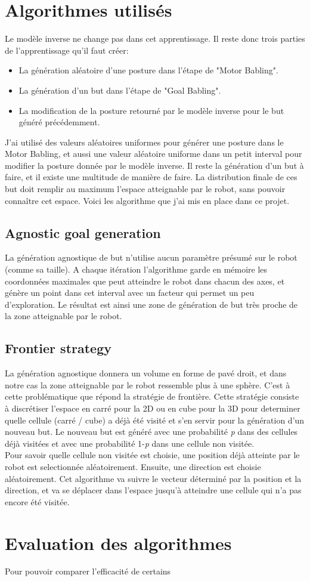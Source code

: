 \documentclass{article}
\begin{document}
\section*{Algorithmes utilisés}

Le modèle inverse ne change pas dans cet apprentissage. Il reste donc trois parties de l'apprentissage qu'il faut créer:
\begin{itemize}
    \item La génération aléatoire d'une posture dans l'étape de "Motor Babling".
    \item La génération d'un but dans l'étape de "Goal Babling".
    \item La modification de la posture retourné par le modèle inverse pour le but généré précédemment.
\end{itemize}
J'ai utilisé des valeurs aléatoires uniformes pour générer une posture dans le Motor Babling, et aussi une valeur aléatoire uniforme dans un petit interval pour modifier la posture donnée par le modèle inverse. Il reste la génération d'un but à faire, et il existe une multitude de manière de faire. La distribution finale de ces but doit remplir au maximum l'espace atteignable par le robot, sans pouvoir connaître cet espace. Voici les algorithme que j'ai mis en place dans ce projet.

\subsection*{Agnostic goal generation}

La génération agnostique de but n'utilise aucun paramètre présumé sur le robot (comme sa taille). A chaque itération l'algorithme garde en mémoire les coordonnées maximales que peut atteindre le robot dans chacun des axes, et génère un point dans cet interval avec un facteur qui permet un peu d'exploration. Le résultat est ainsi une zone de génération de but très proche de la zone atteignable par le robot.

\subsection*{Frontier strategy}

La génération agnostique donnera un volume en forme de pavé droit, et dans notre cas la zone atteignable par le robot ressemble plus à une sphère. C'est à cette problématique que répond la stratégie de frontière. Cette stratégie consiste à discrétiser l'espace en carré pour la 2D ou en cube pour la 3D pour determiner quelle cellule (carré / cube)  a déjà été visité et s'en servir pour la génération d'un nouveau but. Le nouveau but est généré avec une probabilité \emph{p} dans des cellules déjà visitées et avec une probabilité 1-\emph{p} dans une cellule non visitée.\\
Pour savoir quelle cellule non visitée est choisie, une position déjà atteinte par le robot est selectionnée aléatoirement. Ensuite, une direction est choisie aléatoirement. Cet algorithme va suivre le vecteur déterminé par la position et la direction, et va se déplacer dans l'espace jusqu'à atteindre une cellule qui n'a pas encore été visitée.

\section*{Evaluation des algorithmes}

Pour pouvoir comparer l'efficacité de certains
\end{document}
